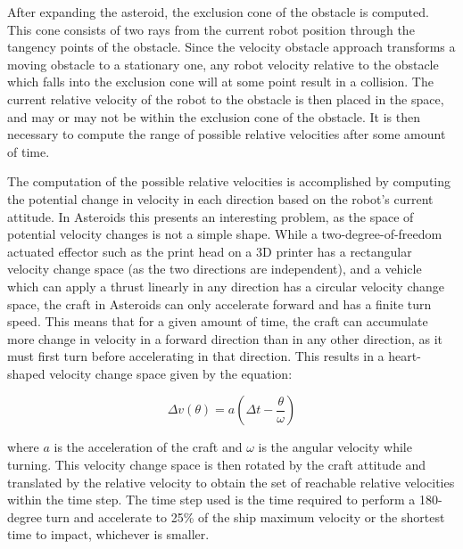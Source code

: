 \documentclass[10pt,draft,conference]{IEEEtran}
\begin{document}
After expanding the asteroid, the exclusion cone of the obstacle is computed. This cone consists of two rays from the current robot position through the tangency points of the obstacle. Since the velocity obstacle approach transforms a moving obstacle to a stationary one, any robot velocity relative to the obstacle which falls into the exclusion cone will at some point result in a collision. The current relative velocity of the robot to the obstacle is then placed in the space, and may or may not be within the exclusion cone of the obstacle. It is then necessary to compute the range of possible relative velocities after some amount of time.

The computation of the possible relative velocities is accomplished by computing the potential change in velocity in each direction based on the robot's current attitude. In Asteroids this presents an interesting problem, as the space of potential velocity changes is not a simple shape. While a two-degree-of-freedom actuated effector such as the print head on a 3D printer has a rectangular velocity change space (as the two directions are independent), and a vehicle which can apply a thrust linearly in any direction has a circular velocity change space, the craft in Asteroids can only accelerate forward and has a finite turn speed. This means that for a given amount of time, the craft can accumulate more change in velocity in a forward direction than in any other direction, as it must first turn before accelerating in that direction. This results in a heart-shaped velocity change space given by the equation:

\begin{equation*}
\Delta v(\theta) = a \left( \Delta t - \frac{\theta}{\omega} \right)
\end{equation*}

where $a$ is the acceleration of the craft and $\omega$ is the angular velocity while turning. This velocity change space is then rotated by the craft attitude and translated by the relative velocity to obtain the set of reachable relative velocities within the time step. The time step used is the time required to perform a 180-degree turn and accelerate to 25\% of the ship maximum velocity or the shortest time to impact, whichever is smaller. 
\end{document}

